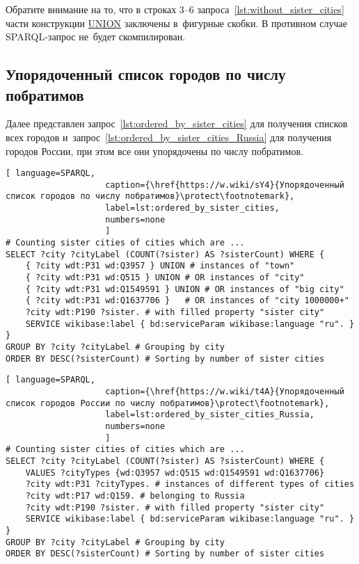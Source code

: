 Обратите внимание на то, что в строках 3--6 запроса~\ref{lst:without_sister_cities} 
части конструкции \href{https://en.wikibooks.org/wiki/SPARQL/UNION}{UNION} заключены в~фигурные скобки. 
В противном случае SPARQL-запрос не~будет скомпилирован.



\newpage
\subsection{Упорядоченный список городов по числу побратимов}

Далее представлен запрос~\ref{lst:ordered_by_sister_cities} 
для получения списков всех городов 
и~запрос~\ref{lst:ordered_by_sister_cities_Russia} для получения городов России, 
при этом все они упорядочены по числу побратимов.

\begin{lstlisting}[ language=SPARQL, 
                    caption={\href{https://w.wiki/sY4}{Упорядоченный список городов по числу побратимов}\protect\footnotemark},
                    label=lst:ordered_by_sister_cities,
                    numbers=none
                    ]
# Counting sister cities of cities which are ...
SELECT ?city ?cityLabel (COUNT(?sister) AS ?sisterCount) WHERE {           
	{ ?city wdt:P31 wd:Q3957 } UNION # instances of "town"
	{ ?city wdt:P31 wd:Q515 } UNION # OR instances of "city"
	{ ?city wdt:P31 wd:Q1549591 } UNION # OR instances of "big city"
	{ ?city wdt:P31 wd:Q1637706 }	# OR instances of "city 1000000+"
	?city wdt:P190 ?sister. # with filled property "sister city"
	SERVICE wikibase:label { bd:serviceParam wikibase:language "ru". }
}
GROUP BY ?city ?cityLabel # Grouping by city                                   
ORDER BY DESC(?sisterCount) # Sorting by number of sister cities
\end{lstlisting}

\begin{lstlisting}[ language=SPARQL, 
                    caption={\href{https://w.wiki/t4A}{Упорядоченный список городов России по числу побратимов}\protect\footnotemark},
                    label=lst:ordered_by_sister_cities_Russia,
                    numbers=none
                    ]
# Counting sister cities of cities which are ...
SELECT ?city ?cityLabel (COUNT(?sister) AS ?sisterCount) WHERE {           
	VALUES ?cityTypes {wd:Q3957 wd:Q515 wd:Q1549591 wd:Q1637706}
	?city wdt:P31 ?cityTypes. # instances of different types of cities
	?city wdt:P17 wd:Q159. # belonging to Russia
	?city wdt:P190 ?sister. # with filled property "sister city"
	SERVICE wikibase:label { bd:serviceParam wikibase:language "ru". }
}
GROUP BY ?city ?cityLabel # Grouping by city
ORDER BY DESC(?sisterCount) # Sorting by number of sister cities
\end{lstlisting}

